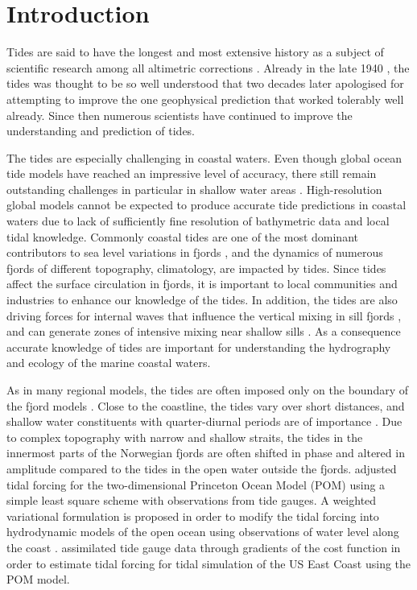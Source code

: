 \section{Introduction}

Tides are said to have the longest and most extensive history as a subject of scientific research among all altimetric corrections \cite[]{egbert94,cartwright77,hendershott81}. 
Already in the late 1940 \citep{unna47}, the tides was thought to be so well understood that two decades later \cite{munk66} apologised for attempting to improve the one geophysical prediction that worked tolerably well already. Since then numerous scientists have continued to improve the understanding and prediction of tides. 

The tides are especially challenging in coastal waters. Even though global ocean tide models have reached an impressive level of accuracy, there still remain outstanding challenges in particular in shallow water areas \citep{stammer14}. High-resolution global models cannot be expected to produce accurate tide predictions in coastal waters due to lack of sufficiently fine resolution of  bathymetric data and local tidal knowledge. Commonly coastal tides are one of the most dominant contributors to sea level variations in fjords \citep[e.g.][]{grabbe09}, and the dynamics of numerous fjords of different topography, climatology, are impacted by tides. Since tides affect the surface circulation in fjords, it is important to local communities and industries to enhance our knowledge of the tides. In addition, the tides are also driving forces for internal waves that influence the vertical mixing in sill fjords \citep{stigebrandt76}, and can generate zones of intensive mixing near shallow sills \citep{staal15}. As a consequence accurate knowledge of tides are important for understanding the hydrography and ecology of the marine coastal waters.

As in many regional models, the tides are often imposed only on the boundary of the fjord models \citep{gjevik89,carniello05,lynge13}. Close to the coastline, the tides vary over short distances, and shallow water constituents with quarter-diurnal periods are of importance \citep[e.g.][for the case of the Oslofjord]{trygg74}. 
Due to complex topography with narrow and shallow straits, the tides in the innermost parts of the Norwegian fjords are often shifted in phase and altered in amplitude compared to the tides in the open water outside the fjords. \cite{chen99} adjusted tidal forcing for the two-dimensional Princeton Ocean Model (POM) using a simple least square scheme with observations from tide gauges. A weighted variational formulation is proposed in order to modify the tidal forcing into hydrodynamic models of the open ocean using observations of water level along the coast \citep{bennett82}. \cite{zhang03} assimilated tide gauge data through gradients of the cost function in order to estimate tidal forcing for tidal simulation of the US East Coast using the POM model.

